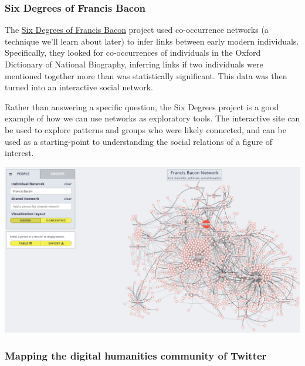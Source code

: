 \documentclass[
]{book}
\begin{document}
\hypertarget{six-degrees-of-francis-bacon}{%
\subsubsection{Six Degrees of Francis Bacon}\label{six-degrees-of-francis-bacon}}

The \href{http://www.sixdegreesoffrancisbacon.com/}{Six Degrees of Francis Bacon} project used co-occurrence networks (a technique we'll learn about later) to infer links between early modern individuals. Specifically, they looked for co-occurrences of individuals in the Oxford Dictionary of National Biography, inferring links if two individuals were mentioned together more than was statistically significant. This data was then turned into an interactive social network.

Rather than answering a specific question, the Six Degrees project is a good example of how we can use networks as exploratory tools. The interactive site can be used to explore patterns and groups who were likely connected, and can be used as a starting-point to understanding the social relations of a figure of interest.

\includegraphics[width=6.25in,height=\textheight]{images/Screenshot 2022-10-03 at 11.26.54.png}

\hypertarget{mapping-the-digital-humanities-community-of-twitter}{%
\subsubsection{Mapping the digital humanities community of Twitter}\label{mapping-the-digital-humanities-community-of-twitter}}
\end{document}
